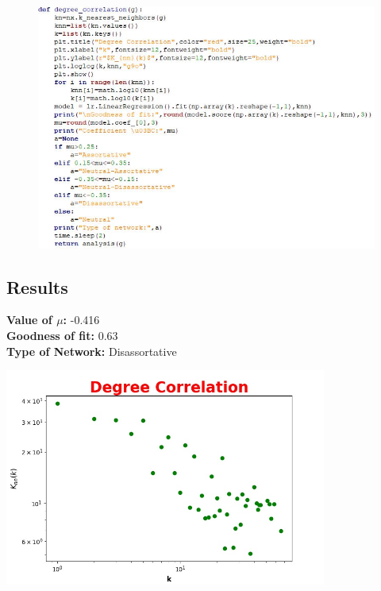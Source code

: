 \documentclass{article}
\begin{document}
\begin{figure}[h!]
\centering
\includegraphics[width=400pt]{degreeprogram.JPG}
\advance\leftskip-1.52cm
\end{figure}



\textcolor{Titoli}{\subsection{Results}}
\noindent\begin{minipage}{0.5\textwidth}\raggedright
\textbf{Value of $\mu$: }-0.416\\
\textbf{Goodness of fit: }0.63\\
\textbf{Type of Network: }Disassortative
\end{minipage}%
\hfill%
\begin{minipage}{0.5\textwidth}
\vspace{-120pt}
\includegraphics[width=300pt]{degreecorrelation.jpeg}
\end{minipage}
\newpage
\end{document}

